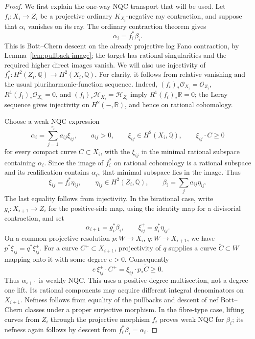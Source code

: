 \begin{proof}
We first explain the one-way NQC transport that will be used. Let
$f_i:X_i\to Z_i$ be a projective ordinary $K_{X_i}$-negative ray
contraction, and suppose that $\alpha_i$ vanishes on its ray. The
ordinary contraction theorem gives
\[
                 \alpha_i=f_i^*\beta_i.
\]
This is Bott--Chern descent on the already projective log Fano
contraction, by Lemma~\ref{lem:pullback-image}; the target has rational
singularities and the required higher direct images vanish. We will also use
injectivity of
$f_i^*:H^2(Z_i,\mathbb Q)\to H^2(X_i,\mathbb Q)$.
For clarity, it follows from relative vanishing and the usual
pluriharmonic-function sequence. Indeed,
$(f_i)_*\mathcal O_{X_i}=\mathcal O_{Z_i}$,
$R^1(f_i)_*\mathcal O_{X_i}=0$, and
$(f_i)_*\mathcal H_{X_i}=\mathcal H_{Z_i}$ imply
$R^1(f_i)_*\mathbb R=0$; the Leray sequence gives injectivity on
$H^2(-,\mathbb R)$, and hence on rational cohomology.

Choose a weak NQC expression
\[
 \alpha_i=\sum_{j=1}^{r_i}a_{ij}\xi_{ij},
 \qquad a_{ij}>0,\qquad
 \xi_{ij}\in H^2(X_i,\mathbb Q),\qquad
 \xi_{ij}\cdot C\geq0
\]
for every compact curve $C\subset X_i$, with the $\xi_{ij}$ in
the minimal rational subspace containing $\alpha_i$.
Since the image of $f_i^*$ on rational cohomology is a rational
subspace and its realification contains $\alpha_i$, that minimal
subspace lies in the image. Thus
\[
 \xi_{ij}=f_i^*\eta_{ij},\qquad
 \eta_{ij}\in H^2(Z_i,\mathbb Q),\qquad
 \beta_i=\sum_j a_{ij}\eta_{ij}.
\]
The last equality follows from injectivity. In the birational case,
write $g_i:X_{i+1}\to Z_i$ for the positive-side map, using the
identity map for a divisorial contraction, and set
\[
 \alpha_{i+1}=g_i^*\beta_i,\qquad
 \xi_{ij}^+=g_i^*\eta_{ij}.
\]
On a common projective resolution $p:W\to X_i$, $q:W\to X_{i+1}$,
we have $p^*\xi_{ij}=q^*\xi_{ij}^+$. For a curve
$C^+\subset X_{i+1}$, projectivity of $q$ supplies a curve
$\widetilde C\subset W$ mapping onto it with some degree $e>0$.
Consequently
\[
 e\,\xi_{ij}^+\cdot C^+
   =\xi_{ij}\cdot p_*\widetilde C\geq0.
\]
Thus $\alpha_{i+1}$ is weakly NQC. This uses a positive-degree
multisection, not a degree-one lift. Its rational components may
acquire different integral denominators on $X_{i+1}$.
Nefness follows from equality of the pullbacks and descent of nef
Bott--Chern classes under a proper surjective morphism. In the
fibre-type case, lifting curves from $Z_i$ through the projective
morphism $f_i$ proves weak NQC for $\beta_i$; its nefness again
follows by descent from $f_i^*\beta_i=\alpha_i$.


\end{proof}
